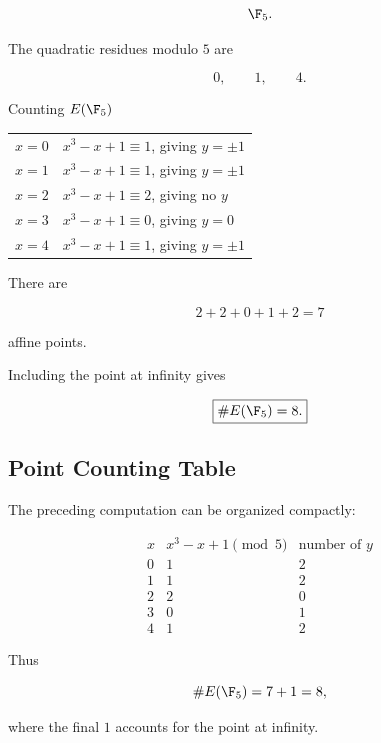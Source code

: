 \[ \F_5. \]

The quadratic residues modulo \(5\) are

\[ 0,\qquad1,\qquad4. \]

\begin{workedexamplebox}{Counting \(E(\F_5)\)}

\begin{tabularx}{\textwidth}{@{}>{\raggedright\arraybackslash}p{}X@{}}
\(x=0\) & \(x^3-x+1\equiv1\), giving \(y=\pm1\)\\
\(x=1\) & \(x^3-x+1\equiv1\), giving \(y=\pm1\)\\
\(x=2\) & \(x^3-x+1\equiv2\), giving no \(y\)\\
\(x=3\) & \(x^3-x+1\equiv0\), giving \(y=0\)\\
\(x=4\) & \(x^3-x+1\equiv1\), giving \(y=\pm1\)
\end{tabularx}

There are

\[ 2+2+0+1+2=7 \]

affine points.

Including the point at infinity gives

\begin{answerbox}
\[ \boxed{\#E(\F_5)=8.} \]
\end{answerbox}
\end{workedexamplebox}

\subsection{Point Counting Table}
\label{subsec:point-counting-table}

The preceding computation can be organized compactly:

\[
\begin{array}{c|c|c}
x & x^3-x+1\pmod5 & \text{number of }y\\
\hline
0 & 1 & 2\\
1 & 1 & 2\\
2 & 2 & 0\\
3 & 0 & 1\\
4 & 1 & 2
\end{array}
\]

Thus

\[ \#E(\F_5)=7+1=8, \]

where the final \(1\) accounts for the point at infinity.


